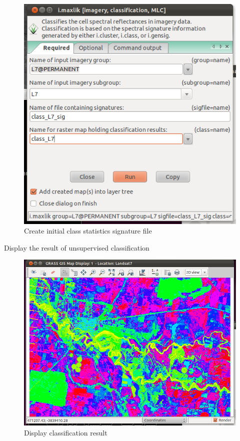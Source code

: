 \begin{figure}[htbp]
   \centering
   \includegraphics[scale=0.35]{grass_rs011.png}
   \caption{Create initial class statistics signature file}
   \label{fig:grass_rs011}
\end{figure}

Display the result of unsupervised classification

\begin{figure}[htbp]
   \centering
   \includegraphics[scale=0.35]{grass_rs012.png}
   \caption{Display classification result}
   \label{fig:grass_rs012}
\end{figure}

